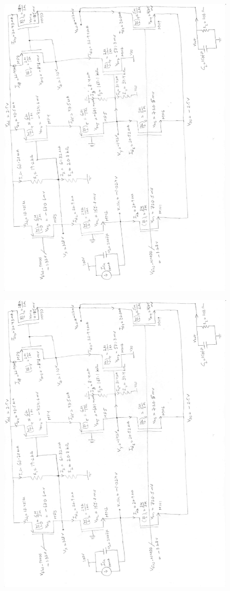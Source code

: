 \documentclass[12pt,a4paper]{article}
\begin{document}
{\centering
	\includegraphics[page=1, angle=270, width=0.88\textwidth]{project_schematic.pdf}\par
}

{\centering
	\includegraphics[page=2, angle=270, width=0.88\textwidth]{project_schematic.pdf}\par
}
\end{document}
